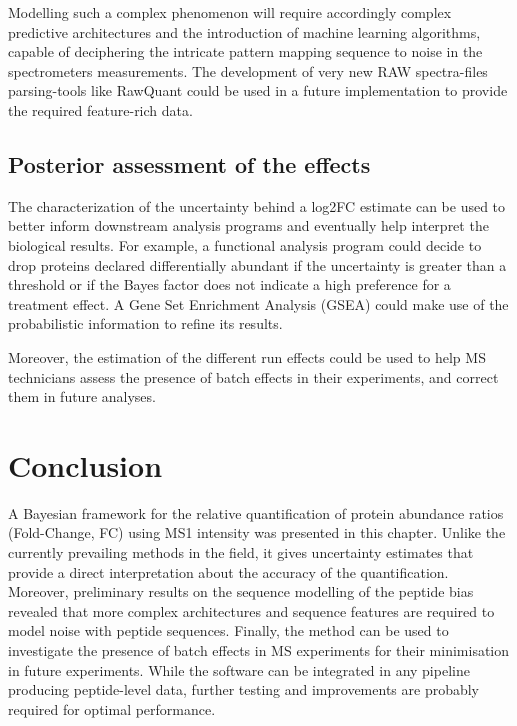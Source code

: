 Modelling such a complex phenomenon will require accordingly complex predictive architectures and the introduction of machine learning algorithms, capable of deciphering the intricate pattern mapping sequence to noise in the spectrometer\textquotesingle s measurements. The development of very new RAW spectra-files parsing-tools like RawQuant \cite{Kovalchik2018} could be used in a future implementation to provide the required feature-rich data.


\subsection{Posterior assessment of the effects}

The characterization of the uncertainty behind a \ac{log2FC} estimate can be used to better inform downstream analysis programs and eventually help interpret the biological results. For example, a functional analysis program could decide to drop proteins declared differentially abundant if the uncertainty is greater than a threshold or if the Bayes factor does not indicate a high preference for a treatment effect. A Gene Set Enrichment Analysis (\ac{GSEA}) could make use of the probabilistic information to refine its results.

Moreover, the estimation of the different run effects could be used to help \ac{MS} technicians assess the presence of batch effects in their experiments, and correct them in future analyses.

\section{Conclusion}

A Bayesian framework for the relative quantification of protein abundance ratios (Fold-Change, FC) using \ac{MS1} intensity was presented in this chapter. Unlike the currently prevailing methods in the field, it gives uncertainty estimates that provide a direct interpretation about the accuracy of the quantification. Moreover, preliminary results on the sequence modelling of the peptide bias revealed that more complex architectures and sequence features are required to model noise with peptide sequences. Finally, the method can be used to investigate the presence of batch effects in \ac{MS} experiments for their minimisation in future experiments. While the software can be integrated in any pipeline producing peptide-level data, further testing and improvements are probably required for optimal performance.
